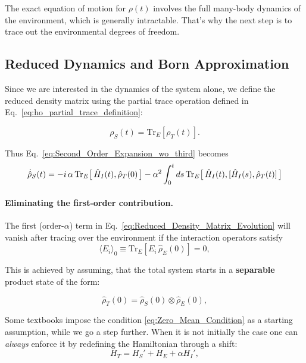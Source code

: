 \noindent
The exact equation of motion for $\rho(t)$ involves the full many-body dynamics of the environment, which is generally intractable. That's why the next step is to trace out the environmental degrees of freedom.


\subsection{Reduced Dynamics and Born Approximation}
\label{subsec:reduced_dynamics_born_approximation}

\noindent
Since we are interested in the dynamics of the system alone, we define the reduced density matrix using the partial trace operation defined in Eq.~\eqref{eq:ho_partial_trace_definition}:

\begin{equation}
	\rho_S(t)= \mathrm{Tr}_E[\rho_T(t)].
	\label{eq:Reduced_Density_Matrix}
\end{equation}

Thus Eq.~\eqref{eq:Second_Order_Expansion_wo_third} becomes
\begin{equation}
	\dot{\hat{\rho}}_S(t) = -i \, \alpha \, \mathrm{Tr}_E\big[\,\hat{H}_I(t),\hat{\rho}_T(0)\,\big]
	- \alpha^2 \int_0^t ds\, \mathrm{Tr}_E \big[\,\hat{H}_I(t), [\hat{H}_I(s), \hat{\rho}_T(t)] \,\big] \notag
	\label{eq:Reduced_Density_Matrix_Evolution}
\end{equation}

\paragraph{Eliminating the first-order contribution.}

\noindent
The first (order-$\alpha$) term in Eq.~\eqref{eq:Reduced_Density_Matrix_Evolution} will vanish after tracing over the environment if the interaction operators satisfy 
\begin{equation}
	\langle E_i \rangle_0 \equiv \mathrm{Tr}_E[E_i \, \hat{\rho}_E(0)] = 0,
	\label{eq:Zero_Mean_Condition}
\end{equation}

\noindent
This is achieved by assuming, that the total system starts in a \textbf{separable} product state of the form:

\begin{equation}
	\hat{\rho}_T(0) = \hat{\rho}_S(0) \otimes \hat{\rho}_E(0),
	\label{eq:Initial_Product_State}
\end{equation}

\noindent
Some textbooks impose the condition \eqref{eq:Zero_Mean_Condition} as a starting assumption, while we go a step further. When it is not initially the case one can \emph{always} enforce it by redefining the Hamiltonian through a shift:
\begin{equation}
	H_T = H_S' + H_E + \alpha H_I',
	\label{eq:Shifted_Total_Hamiltonian}
\end{equation}

